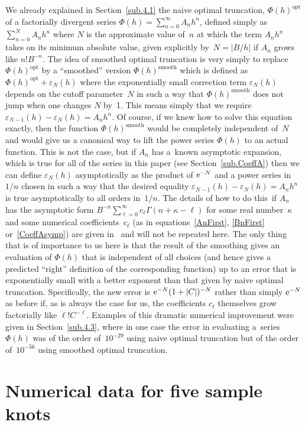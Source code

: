 \documentclass[pdftex]{sigma}
\numberwithin{equation}{section}
\def\k{\kappa}
\def\G{\Gamma}
\def\G{\Gamma}
\def\ve{\varepsilon}
\def\opt{{\mathrm{opt}}}
\def\smo{{\mathrm{smooth}}}
\begin{document}
We already explained in Section~\ref{sub.4.1} the naive optimal truncation,
$\Phi(h)^\opt$ of a factorially divergent series $\Phi(h)=\sum_{n=0}^\infty A_nh^n$,
defined simply as $\sum_{n=0}^NA_nh^n$ where $N$ is the approximate
value of~$n$ at which the term $A_nh^n$ takes on its minimum absolute value,
given explicitly by~${N=|B/h|}$ if $A_n$ grows like $n! B^{-n}$. The idea of
smoothed optimal truncation is very simply to replace $\Phi(h)^\opt$ by a
``smoothed'' version $\Phi(h)^\smo$ which is defined as $\Phi(h)^\opt+\ve_N(h)$
where the exponentially small correction term $\ve_N(h)$ depends on the cutoff
parameter~$N$ in such a way that $\Phi(h)^\smo$ does not jump when one changes $N$
by~1. This means simply that we require~${\ve_{N-1}(h)-\ve_N(h)=A_nh^n}$. Of course, if
we knew how to solve this equation exactly, then the function $\Phi(h)^\smo$
would be completely independent of~$N$ and would give us a canonical way to
lift the power series $\Phi(h)$ to an actual function. This is not the case,
but if $A_n$ has a~known asymptotic expansion, which is true for all of the
series in this paper (see Section~\ref{sub.CoeffA}) then we can define
$\ve_N(h)$ asymptotically as the product of ${\rm e}^{-N}$ and a power series in~$1/n$
chosen in such a way that the desired equality $\ve_{N-1}(h)-\ve_N(h)=A_nh^n$
is true asymptotically to all orders in~$1/n$. The details of how to do this\
if $A_n$ has the asymptotic form $B^{-n} \sum_{\ell=0}^\infty c_\ell \G(n+\k-\ell)$
for some real number~$\k$ and some numerical coefficients~$c_\ell$ (as in
equations~\eqref{AnFirst}, \eqref{BnFirst} or~\eqref{CoeffAsymp}) are given
in~\cite{GZ:optimal} and will not be repeated here. The only thing that is of
importance to us here is that the result of the smoothing gives an evaluation of
$\Phi(h)$ that is independent of all choices (and hence gives a predicted ``right''
definition of the corresponding function) up to an error that is exponentially small
with a better exponent than that given by naive optimal truncation. Specifically,
the new error is ${\rm e}^{-N} (1+|C|)^{-N}$ rather than simply ${\rm e}^{-N}$ as before if, as
is always the case for us, the coefficients $c_\ell$ themselves grow factorially
like $\ell! C^{-\ell}$. Examples of this dramatic numerical improvement were given
in Section~\ref{sub.4.3}, where in one case the error in evaluating a~series
$\Phi(h)$ was of the order of~$10^{-29}$ using naive optimal truncation but of the
order of~$10^{-56}$ using smoothed optimal truncation.

\appendix
\section{Numerical data for five sample knots}\label{sec.num}
\end{document}
